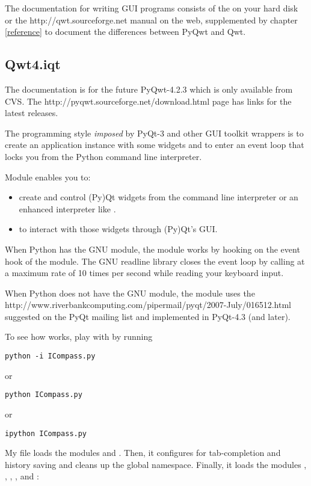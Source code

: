 \documentclass{manual}
\newcommand{\Qwt}{\ulink{Qwt}
  {http://qwt.sourceforge.net}}
\newcommand{\Download}{\ulink{download}
  {http://pyqwt.sourceforge.net/download.html}}
\newcommand{\Future}{
  \begin{notice}[warning]
    The documentation is for the future PyQwt-4.2.3 which is only available
    from CVS. The \Download{} page has links for the latest releases.
  \end{notice}
}
\begin{document}
The documentation for writing GUI programs consists of the
 on your hard disk or the \Qwt{} manual on
the web, supplemented by chapter \ref{reference} to document the differences
between PyQwt and Qwt.


\subsection{Qwt4.iqt
  \label{iqt-intro}}

\Future{}

The programming style \emph{imposed} by PyQt-3 and other GUI toolkit wrappers
is to create an application instance with some widgets and to enter an event
loop that locks you from the Python command line interpreter.

Module  enables you to:
\begin{itemize}
\item
  create and control (Py)Qt widgets from the command line interpreter or an
  enhanced interpreter like .
\item
  to interact with those widgets through (Py)Qt's GUI.
\end{itemize}

When Python has the GNU  module, the  module
works by hooking  on the event hook of the
 module. The GNU readline library closes the event loop by
calling   at a maximum rate of 10 times per
second while reading your keyboard input.

When Python does not have the GNU  module, the
 module uses the
{
  {http://www.riverbankcomputing.com/pipermail/pyqt/2007-July/016512.html}}
suggested on the PyQt mailing list and implemented in PyQt-4.3 (and later).

To see how  works, play with  by running
\begin{verbatim}
python -i ICompass.py
\end{verbatim}
or
\begin{verbatim}
python ICompass.py
\end{verbatim}
or
\begin{verbatim}
ipython ICompass.py
\end{verbatim}

My  file loads the modules  and
.  Then, it configures  for tab-completion
and history saving and cleans up the global namespace.
Finally, it loads the modules , , ,
,  and :

\end{document}
